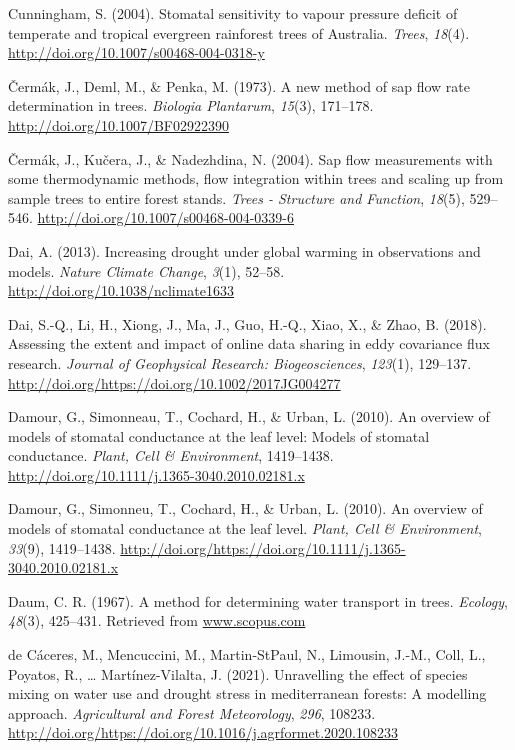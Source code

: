 \documentclass[11pt,twoside]{reedthesis}
\begin{document}
\hypertarget{ref-cunningham_stomatal_2004}{}
Cunningham, S. (2004). Stomatal sensitivity to vapour pressure deficit
of temperate and tropical evergreen rainforest trees of Australia.
\emph{Trees}, \emph{18}(4).
\url{http://doi.org/10.1007/s00468-004-0318-y}

\hypertarget{ref-cermak1973}{}
Čermák, J., Deml, M., \& Penka, M. (1973). A new method of sap flow rate
determination in trees. \emph{Biologia Plantarum}, \emph{15}(3),
171--178. \url{http://doi.org/10.1007/BF02922390}

\hypertarget{ref-Cermak2004}{}
Čermák, J., Kučera, J., \& Nadezhdina, N. (2004). Sap flow measurements
with some thermodynamic methods, flow integration within trees and
scaling up from sample trees to entire forest stands. \emph{Trees -
Structure and Function}, \emph{18}(5), 529--546.
\url{http://doi.org/10.1007/s00468-004-0339-6}

\hypertarget{ref-Dai2013}{}
Dai, A. (2013). Increasing drought under global warming in observations
and models. \emph{Nature Climate Change}, \emph{3}(1), 52--58.
\url{http://doi.org/10.1038/nclimate1633}

\hypertarget{ref-Dai2018}{}
Dai, S.-Q., Li, H., Xiong, J., Ma, J., Guo, H.-Q., Xiao, X., \& Zhao, B.
(2018). Assessing the extent and impact of online data sharing in eddy
covariance flux research. \emph{Journal of Geophysical Research:
Biogeosciences}, \emph{123}(1), 129--137.
\url{http://doi.org/https://doi.org/10.1002/2017JG004277}

\hypertarget{ref-damour_overview_2010}{}
Damour, G., Simonneau, T., Cochard, H., \& Urban, L. (2010). An overview
of models of stomatal conductance at the leaf level: Models of stomatal
conductance. \emph{Plant, Cell \& Environment}, 1419--1438.
\url{http://doi.org/10.1111/j.1365-3040.2010.02181.x}

\hypertarget{ref-Damour2010}{}
Damour, G., Simonneu, T., Cochard, H., \& Urban, L. (2010). An overview
of models of stomatal conductance at the leaf level. \emph{Plant, Cell
\& Environment}, \emph{33}(9), 1419--1438.
\url{http://doi.org/https://doi.org/10.1111/j.1365-3040.2010.02181.x}

\hypertarget{ref-Daum1967}{}
Daum, C. R. (1967). A method for determining water transport in trees.
\emph{Ecology}, \emph{48}(3), 425--431. Retrieved from
\url{www.scopus.com}

\hypertarget{ref-decaceres2021}{}
de Cáceres, M., Mencuccini, M., Martin-StPaul, N., Limousin, J.-M.,
Coll, L., Poyatos, R., \ldots{} Martínez-Vilalta, J. (2021). Unravelling
the effect of species mixing on water use and drought stress in
mediterranean forests: A modelling approach. \emph{Agricultural and
Forest Meteorology}, \emph{296}, 108233.
\url{http://doi.org/https://doi.org/10.1016/j.agrformet.2020.108233}
\end{document}
